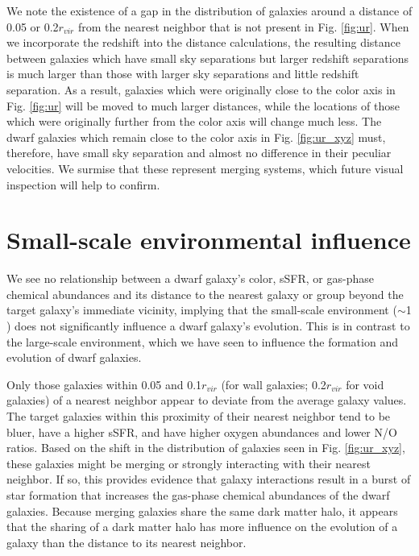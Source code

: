 We note the existence of a gap in the distribution of galaxies around a distance 
of 0.05 \hMpc or 0.2$r_{vir}$ from the nearest neighbor that is not present in 
Fig. \ref{fig:ur}.  When we incorporate the redshift into the distance 
calculations, the resulting distance between galaxies which have small sky 
separations but larger redshift separations is much larger than those with 
larger sky separations and little redshift separation.  As a result, galaxies 
which were originally close to the color axis in Fig. \ref{fig:ur} will be 
moved to much larger distances, while the locations of those which were 
originally further from the color axis will change much less.  The dwarf 
galaxies which remain close to the color axis in Fig. \ref{fig:ur_xyz} must, 
therefore, have small sky separation and almost no difference in their peculiar 
velocities.  We surmise that these represent merging systems, which future 
visual inspection will help to confirm.




\section[Environmental influence]{Small-scale environmental influence}

We see no relationship between a dwarf galaxy's color, sSFR, or gas-phase 
chemical abundances and its distance to the nearest galaxy or group beyond the 
target galaxy's immediate vicinity, implying that the small-scale environment 
($\sim$1 \hMpc) does not significantly influence a dwarf galaxy's evolution.  
This is in contrast to the large-scale environment, which we have seen to 
influence the formation and evolution of dwarf galaxies.

Only those galaxies within 0.05 \hMpc and 0.1$r_{vir}$ (for wall galaxies; 
0.2$r_{vir}$ for void galaxies) of a nearest neighbor appear to deviate from the 
average galaxy values.  The target galaxies within this proximity of their 
nearest neighbor tend to be bluer, have a higher sSFR, and have higher oxygen 
abundances and lower N/O ratios.  Based on the shift in the distribution of 
galaxies seen in Fig. \ref{fig:ur_xyz}, these galaxies might be merging or 
strongly interacting with their nearest neighbor.  If so, this provides evidence 
that galaxy interactions result in a burst of star formation that increases the 
gas-phase chemical abundances of the dwarf galaxies.  Because merging galaxies 
share the same dark matter halo, it appears that the sharing of a dark matter 
halo has more influence on the evolution of a galaxy than the distance to its 
nearest neighbor.

